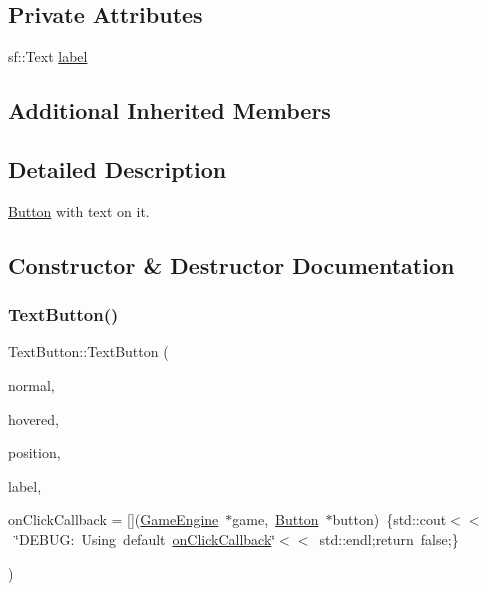 \subsection*{Private Attributes}
\begin{DoxyCompactItemize}
\item 
sf\+::\+Text \mbox{\hyperlink{class_text_button_af83f98d5e8997c8ddd7f47088ad6159b}{label}}
\end{DoxyCompactItemize}
\subsection*{Additional Inherited Members}


\subsection{Detailed Description}
\mbox{\hyperlink{class_button}{Button}} with text on it. 

\subsection{Constructor \& Destructor Documentation}
\mbox{\label{class_text_button_a4a48c2b297b873c7f9a667011f36a8f7}} 
\subsubsection{\texorpdfstring{TextButton()}{TextButton()}\hspace{0.1cm}{\footnotesize\ttfamily [1/2]}}
{\footnotesize\ttfamily Text\+Button\+::\+Text\+Button (\begin{DoxyParamCaption}\item[{sf\+::\+Texture $\ast$}]{normal,  }\item[{sf\+::\+Texture $\ast$}]{hovered,  }\item[{const sf\+::\+Vector2f \&}]{position,  }\item[{const sf\+::\+Text \&}]{label,  }\item[{bool($\ast$)(\mbox{\hyperlink{class_game_engine}{Game\+Engine}} $\ast$game, \mbox{\hyperlink{class_button}{Button}} $\ast$button)}]{on\+Click\+Callback = {\ttfamily \mbox{[}\mbox{]}(\mbox{\hyperlink{class_game_engine}{Game\+Engine}}~$\ast$game,~\mbox{\hyperlink{class_button}{Button}}~$\ast$button)~\{std\+:\+:cout$<$$<$~\char`\"{}DEBUG\+:~Using~default~\mbox{\hyperlink{class_button_a24293b3761997dd52758ee21c0058661}{on\+Click\+Callback}}\char`\"{}$<$$<$~std\+:\+:endl;return~false;\}} }\end{DoxyParamCaption})}

